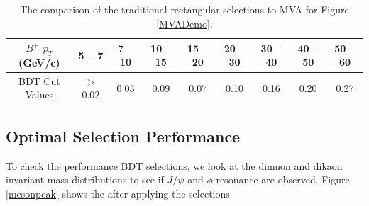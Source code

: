 \begin{table}[h]
\begin{center}
\caption{The comparison of the traditional rectangular selections to MVA for Figure \ref{MVADemo}.}
\vspace{1em}
\label{BPSig}
  \begin{tabular}{ |c | c| c| c| c| c| c| c| c|}
    \hline 
$B^+$ $p_T$ (GeV/c) & 5 -- 7 & 7 -- 10 & 10 -- 15 & 15 -- 20 & 20 -- 30 & 30 -- 40 & 40 -- 50 & 50 -- 60\\
     \hline
 BDT Cut Values & $>$ 0.02  & 0.03  & 0.09 & 0.07  & 0.10 & 0.16 & 0.20 & 0.27  \\
     \hline
    \hline
\end{tabular}
\end{center}
\end{table}


\subsection{Optimal Selection Performance}

To check the performance BDT selections, we look at the dimuon and dikaon invariant mass distributions to see if $J/\psi$ and $\phi$ resonance are observed. Figure \ref{mesonpeak} shows the after applying the selections


